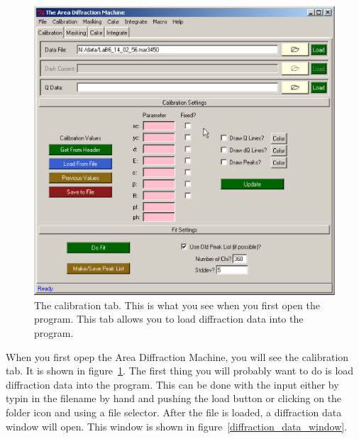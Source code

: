\begin{figure}
    \centering
    \includegraphics[scale=.75]{figures/calibration_tab.eps}
    \caption{The calibration tab.
    This is what you see when you first open the program. 
    This tab allows you to load diffraction
    data into the program.} 
    \label{calibration_tab}
\end{figure}

When you first opep the Area Diffraction Machine, you
will see the calibration tab. It is shown in 
figure~\ref{calibration_tab}. The first thing you
will probably want to do is load diffraction data into
the program. This can be done with the  input
either by typin in the filename by hand and pushing the
load button or clicking on the folder icon and
using a file selector. After the file is loaded, a
diffraction data window will open. This window is 
shown in figure~\ref{diffraction_data_window}.


